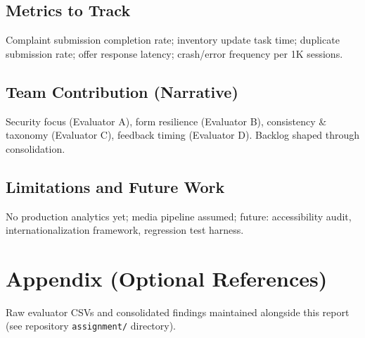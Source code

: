 \documentclass[11pt,a4paper]{article}
\begin{document}
\subsection{Metrics to Track}
Complaint submission completion rate; inventory update task time; duplicate submission rate; offer response latency; crash/error frequency per 1K sessions.

\subsection{Team Contribution (Narrative)}
Security focus (Evaluator A), form resilience (Evaluator B), consistency \& taxonomy (Evaluator C), feedback timing (Evaluator D). Backlog shaped through consolidation.

\subsection{Limitations and Future Work}
No production analytics yet; media pipeline assumed; future: accessibility audit, internationalization framework, regression test harness.

\section*{Appendix (Optional References)}
Raw evaluator CSVs and consolidated findings maintained alongside this report (see repository \texttt{assignment/} directory).
\end{document}

